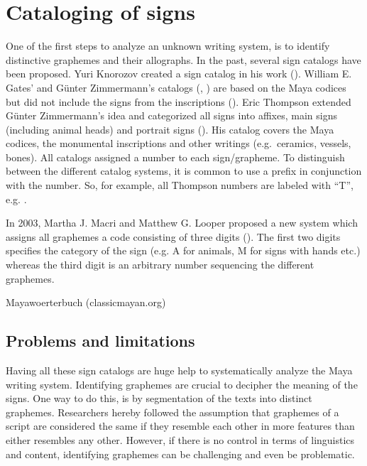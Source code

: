 \documentclass[../main.tex]{subfiles}
\begin{document}
\section{Cataloging of signs}
One of the first steps to analyze an unknown writing system, is to identify distinctive graphemes 
and their allographs. 
In the past, several sign catalogs have been proposed.
Yuri Knorozov created a sign catalog in his work (\cite[109\psq]{knorozov1967}).
William E. Gates' and G\"unter Zimmermann's catalogs (\cite{gates1931}, \cite{zimmermann1956}) are 
based on the Maya codices but did not include the signs from the inscriptions 
(\cite[4]{thompson1962catalog}). 
Eric Thompson extended G\"unter Zimmermann's idea and categorized all signs into affixes, main signs 
(including animal heads) and portrait signs (\cite[4]{thompson1962catalog}).
His catalog covers the Maya codices, the monumental inscriptions and other writings 
(e.g.\ ceramics, vessels, bones).
All catalogs assigned a number to each sign/grapheme.
To distinguish between the different catalog systems, it is common to use a prefix in 
conjunction with the number.
So, for example, all Thompson numbers are labeled with ``T'', e.g. .

In 2003, Martha J. Macri and Matthew G. Looper proposed a new system which assigns all graphemes
a code consisting of three digits (\cite[21,25]{macrilooper2003}).
The first two digits specifies the category of the sign 
(e.g. A for animals, M for signs with hands etc.) whereas the third digit is an arbitrary number
sequencing the different graphemes.

Mayawoerterbuch (classicmayan.org)


\subsection{Problems and limitations}
Having all these sign catalogs are huge help to systematically analyze the Maya writing system.
Identifying graphemes are crucial to decipher the meaning of the signs.
One way to do this, is by segmentation of the texts into distinct graphemes.
Researchers hereby followed the assumption that graphemes of a script are considered the same if 
they resemble each other in more features than either resembles any other.
However, if there is no control in terms of linguistics and content, 
identifying graphemes can be challenging and even be problematic.
\end{document}
